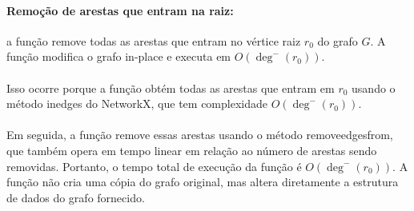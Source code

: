 \documentclass[12pt,a4paper]{article}
\def\texttt#1{#1}%
\def\emph#1{#1}%
\def\_{}%
\begin{document}
\paragraph{Remoção de arestas que entram na raiz:}
a função remove todas as arestas que entram no vértice raiz \(r_0\) do grafo \(G\). A função modifica o grafo \emph{in-place} e executa em \(O(\deg^-(r_0))\). 

\paragraph{}
Isso ocorre porque a função obtém todas as arestas que entram em \(r_0\) usando o método \texttt{in\_edges} do NetworkX, que tem complexidade \(O(\deg^-(r_0))\). 

\paragraph{}
Em seguida, a função remove essas arestas usando o método \texttt{remove\_edges\_from}, que também opera em tempo linear em relação ao número de arestas sendo removidas. Portanto, o tempo total de execução da função é \(O(\deg^-(r_0))\). A função não cria uma cópia do grafo original, mas altera diretamente a estrutura de dados do grafo fornecido. 
\end{document}
